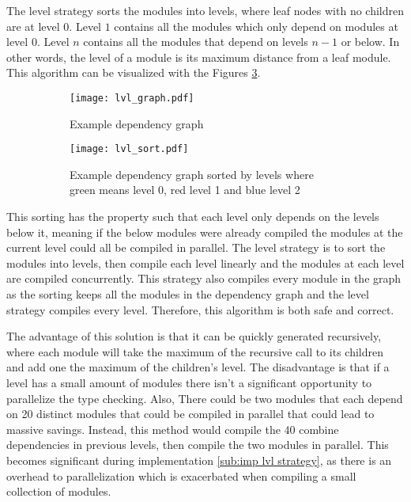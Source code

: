 The level strategy sorts the modules into levels, where leaf nodes with no
children are at level \(0\). Level \(1\) contains all the modules which only depend on
modules at level \(0\). Level \(n\) contains all the modules that depend on levels \(n
- 1\) or below. In other words, the level of a module is its maximum distance
from a leaf module. This algorithm can be visualized with the Figures \ref{subfig: lvl strat}.
\begin{figure}[H]
  \begin{subfigure}[t]{0.45\textwidth}
    \centering
    \texttt{[image: lvl\_graph.pdf]}
    \caption{Example dependency graph}
    \label{fig:example lvl dep graph}
  \end{subfigure} \hfill
  \begin{subfigure}[t]{0.45\textwidth}
    \centering
    \texttt{[image: lvl\_sort.pdf]}
    \caption{Example dependency graph sorted by levels where green means level
    0, red level 1 and blue level 2}
    \label{fig:example lvl sort}
  \end{subfigure}
  \caption{}
  \label{subfig: lvl strat}
\end{figure}

This sorting has the property such that each level only depends on the levels
below it, meaning if the below modules were already compiled the modules at the
current level could all be compiled in parallel. The level strategy is to sort
the modules into levels, then compile each level linearly and the modules at
each level are compiled concurrently. This strategy also compiles every module
in the graph as the sorting keeps all the modules in the dependency graph and
the level strategy compiles every level. Therefore, this algorithm is both safe
and correct.


The advantage of this solution is that it can be quickly generated recursively,
where each module will take the maximum of the recursive call to its children
and add one the maximum of the children's level. The disadvantage is that if a
level has a small amount of modules there isn't a significant opportunity to
parallelize the type checking. Also, There could be two modules that each
depend  on 20 distinct modules that could be compiled in parallel that could
lead to massive savings. Instead, this method would compile the 40 combine
dependencies in previous levels, then compile the two modules in parallel. This
becomes significant during implementation \ref{sub:imp lvl strategy}, as there
is an overhead to parallelization which is exacerbated when compiling a small
collection of modules.


